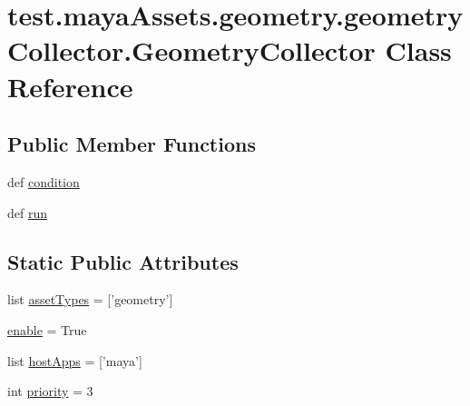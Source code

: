 \hypertarget{classtest_1_1mayaAssets_1_1geometry_1_1geometryCollector_1_1GeometryCollector}{\section{test.\-maya\-Assets.\-geometry.\-geometry\-Collector.\-Geometry\-Collector \-Class \-Reference}
\label{d8/dc5/classtest_1_1mayaAssets_1_1geometry_1_1geometryCollector_1_1GeometryCollector}
}
\subsection*{\-Public \-Member \-Functions}
\begin{DoxyCompactItemize}
\item 
def \hyperlink{classtest_1_1mayaAssets_1_1geometry_1_1geometryCollector_1_1GeometryCollector_abecbe27fa2bdc42759e82d178e90178b}{condition}
\item 
def \hyperlink{classtest_1_1mayaAssets_1_1geometry_1_1geometryCollector_1_1GeometryCollector_a39a6f0badfee0c53f992ebe4c6d892c2}{run}
\end{DoxyCompactItemize}
\subsection*{\-Static \-Public \-Attributes}
\begin{DoxyCompactItemize}
\item 
list \hyperlink{classtest_1_1mayaAssets_1_1geometry_1_1geometryCollector_1_1GeometryCollector_a3d89809e0ca1e23ccae6b0c7883c9173}{asset\-Types} = \mbox{[}'geometry'\mbox{]}
\item 
\hyperlink{classtest_1_1mayaAssets_1_1geometry_1_1geometryCollector_1_1GeometryCollector_ade8cef57959e98ee06c006cf87f4cd80}{enable} = \-True
\item 
list \hyperlink{classtest_1_1mayaAssets_1_1geometry_1_1geometryCollector_1_1GeometryCollector_aff8523b23c76a210b83eb49c27c3e10f}{host\-Apps} = \mbox{[}'maya'\mbox{]}
\item 
int \hyperlink{classtest_1_1mayaAssets_1_1geometry_1_1geometryCollector_1_1GeometryCollector_adaf88ad642cbfe389a9bf6202871daae}{priority} = 3
\end{DoxyCompactItemize}


